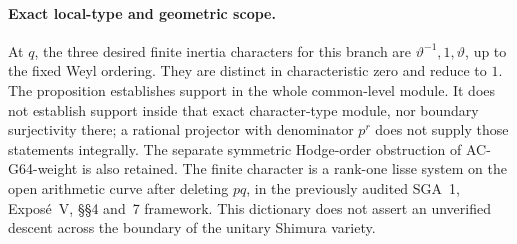 \paragraph{Exact local-type and geometric scope.}
At $q$, the three desired finite inertia characters for this
branch are $\vartheta^{-1},1,\vartheta$, up to the fixed
Weyl ordering.  They are distinct in characteristic zero and
reduce to $1$.  The proposition establishes support in the
whole common-level module.  It does not establish support
inside that exact character-type module, nor boundary
surjectivity there; a rational projector with denominator
$p^r$ does not supply those statements integrally.
The separate symmetric Hodge-order obstruction of
AC-G64-weight is also retained.
The finite character is a rank-one lisse system on the open
arithmetic curve after deleting $pq$, in the previously audited
SGA~1, Expos\'e~V, \S\S4 and~7 framework.  This dictionary
does not assert an unverified descent across the boundary of
the unitary Shimura variety.
